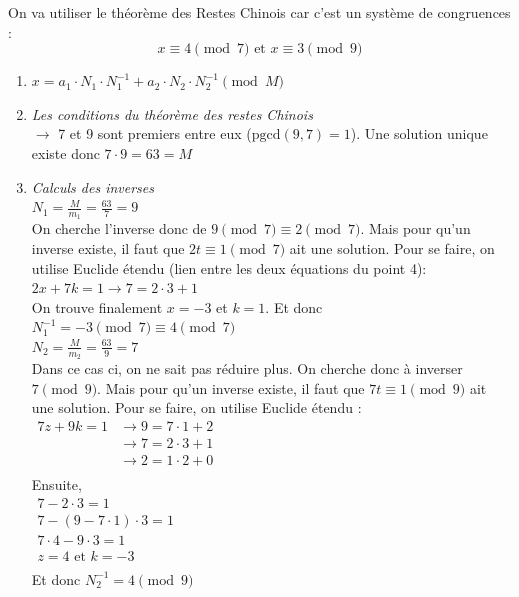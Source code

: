 \begin{solution}
    On va utiliser le théorème des Restes Chinois car c'est un système de congruences : \\
    \[ x \equiv 4 \pmod{7} \text{ et } x \equiv 3 \pmod{9} \]

    \begin{enumerate}
        \item \(x = a_1 \cdot N_{1} \cdot N_{1}^{-1} + a_2 \cdot N_{2} \cdot N_{2}^{-1} \pmod{M} \) 
        
        \item \textit{Les conditions du théorème des restes Chinois} \\
        $\rightarrow$ 7 et 9 sont premiers entre eux (\(\text{pgcd}(9,7) = 1 \)). Une solution unique existe donc \(7 \cdot 9 = 63 = M\)
        
        \item \textit{Calculs des inverses} \\
        \(N_1 = \frac{M}{m_1} = \frac{63}{7} = 9 \) \\
        On cherche l'inverse donc de $9 \pmod{7} \equiv 2 \pmod{7}$. Mais pour qu'un inverse existe, il faut que $2 t \equiv 1 \pmod{7}$ ait une solution. Pour se faire, on utilise Euclide étendu (lien entre les deux équations du point 4): \\
        \( 2 x + 7 k = 1 \rightarrow 7 = 2 \cdot 3 + 1\) \\
        On trouve finalement $x = -3$ et $k = 1$. Et donc $ N_{1}^{-1} = -3 \pmod{7} \equiv 4 \pmod{7}$\\
    
        \(N_2 = \frac{M}{m_2} = \frac{63}{9} = 7\) \\
        Dans ce cas ci, on ne sait pas réduire plus. On cherche donc à inverser $7 \pmod{9}$. Mais pour qu'un inverse existe, il faut que $7 t \equiv 1 \pmod{9}$ ait une solution. Pour se faire, on utilise Euclide étendu : \\
        \(
        \begin{aligned}
            7 z + 9 k = 1 &\rightarrow 9 = 7 \cdot 1 + 2 \\
                          &\rightarrow 7 = 2 \cdot 3 + 1 \\
                          &\rightarrow 2 = 1 \cdot 2 + 0 \\
        \end{aligned}
        \) \\
        Ensuite, \\
        \( \begin{aligned}
            7 - 2 \cdot 3 = 1 \\
            7 - (9 - 7 \cdot 1) \cdot 3 = 1 \\
            7 \cdot 4 - 9 \cdot 3 = 1 \\
            z = 4 \text{ et } k = -3 \\
        \end{aligned}
        \) \\
        Et donc $ N_{2}^{-1} = 4 \pmod{9}$
        

\end{enumerate}
\end{solution}
